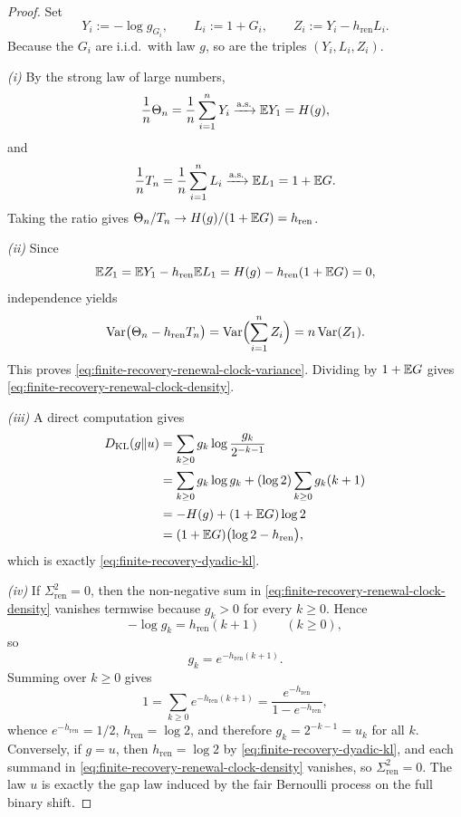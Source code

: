 \begin{proof}
Set
\[
Y_i:=-\log g_{G_i},
\qquad
L_i:=1+G_i,
\qquad
Z_i:=Y_i-h_{\mathrm{ren}}L_i.
\]
Because the $G_i$ are i.i.d.\ with law $g$, so are the triples $(Y_i,L_i,Z_i)$.

\emph{(i)} By the strong law of large numbers,
\[
\frac{1}{n}\Theta_n
=
\frac{1}{n}\sum_{i=1}^n Y_i
\xrightarrow{\textup{a.s.}}
\mathbb{E} Y_1
=
H(g),
\]
and
\[
\frac{1}{n}T_n
=
\frac{1}{n}\sum_{i=1}^n L_i
\xrightarrow{\textup{a.s.}}
\mathbb{E} L_1
=
1+\mathbb{E} G.
\]
Taking the ratio gives $\Theta_n/T_n\to H(g)/(1+\mathbb{E} G)=h_{\mathrm{ren}}$.

\emph{(ii)} Since
\[
\mathbb{E} Z_1
=
\mathbb{E} Y_1-h_{\mathrm{ren}}\mathbb{E} L_1
=
H(g)-h_{\mathrm{ren}}(1+\mathbb{E} G)
=
0,
\]
independence yields
\[
\mathrm{Var}\bigl(\Theta_n-h_{\mathrm{ren}}T_n\bigr)
=
\mathrm{Var}\Bigl(\sum_{i=1}^n Z_i\Bigr)
=
n\,\mathrm{Var}(Z_1).
\]
This proves \eqref{eq:finite-recovery-renewal-clock-variance}. Dividing by $1+\mathbb{E} G$ gives \eqref{eq:finite-recovery-renewal-clock-density}.

\emph{(iii)} A direct computation gives
\begin{align*}
D_{\mathrm{KL}}(g\Vert u)
&=
\sum_{k\ge 0}g_k\log\frac{g_k}{2^{-k-1}}\\
&=
\sum_{k\ge 0}g_k\log g_k
+
(\log 2)\sum_{k\ge 0}g_k(k+1)\\
&=
-H(g)+(1+\mathbb{E} G)\log 2\\
&=
(1+\mathbb{E} G)\bigl(\log 2-h_{\mathrm{ren}}\bigr),
\end{align*}
which is exactly \eqref{eq:finite-recovery-dyadic-kl}.

\emph{(iv)} If $\Sigma_{\mathrm{ren}}^2=0$, then the non-negative sum in \eqref{eq:finite-recovery-renewal-clock-density} vanishes termwise because $g_k>0$ for every $k\ge 0$. Hence
\[
-\log g_k=h_{\mathrm{ren}}(k+1)
\qquad(k\ge 0),
\]
so
\[
g_k=e^{-h_{\mathrm{ren}}(k+1)}.
\]
Summing over $k\ge 0$ gives
\[
1=\sum_{k\ge 0}e^{-h_{\mathrm{ren}}(k+1)}
=
\frac{e^{-h_{\mathrm{ren}}}}{1-e^{-h_{\mathrm{ren}}}},
\]
whence $e^{-h_{\mathrm{ren}}}=1/2$, $h_{\mathrm{ren}}=\log 2$, and therefore $g_k=2^{-k-1}=u_k$ for all $k$. Conversely, if $g=u$, then $h_{\mathrm{ren}}=\log 2$ by \eqref{eq:finite-recovery-dyadic-kl}, and each summand in \eqref{eq:finite-recovery-renewal-clock-density} vanishes, so $\Sigma_{\mathrm{ren}}^2=0$. The law $u$ is exactly the gap law induced by the fair Bernoulli process on the full binary shift.
\end{proof}

